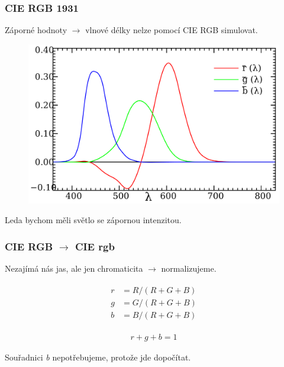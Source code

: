 \documentclass{beamer}
\begin{document}
\begin{frame}
  \center
  \frametitle{CIE RGB 1931}
  Záporné hodnoty $\rightarrow$ vlnové délky nelze pomocí CIE RGB simulovat.
  \begin{figure}
    \includegraphics[height=0.6\textheight]{CIE1931_RGBCMF.pdf}
  \end{figure}
  Leda bychom měli světlo se zápornou intenzitou.
\end{frame}

\begin{frame}
    \center
  \frametitle{CIE RGB $\rightarrow$ CIE rgb}
  Nezajímá nás jas, ale jen chromaticita $\rightarrow$ normalizujeme.

  \begin{align}
    \begin{split}
    r &= R / (R + G + B)\\
    g &= G / (R + G + B)\\
    b &= B / (R + G + B)
  \end{split}
    \label{eq:rgb}
  \end{align}

  \begin{align}
    r+g+b=1
  \end{align}

  Souřadnici \textit{b} nepotřebujeme, protože jde dopočítat.
\end{frame}
\end{document}
